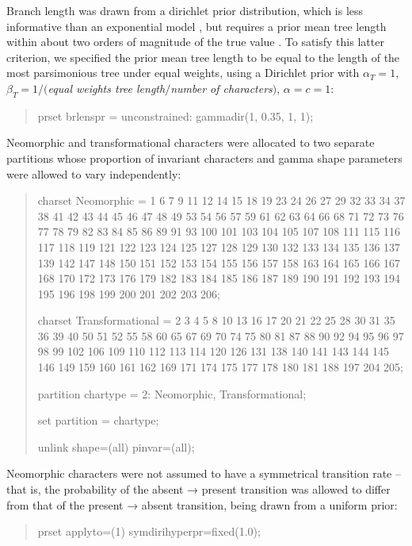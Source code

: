 \documentclass[openany]{book}
\theoremstyle{definition}
\theoremstyle{definition}
\theoremstyle{definition}
\theoremstyle{remark}
\begin{document}
Branch length was drawn from a dirichlet prior distribution, which is
less informative than an exponential model \citep{Rannala2012}, but
requires a prior mean tree length within about two orders of magnitude
of the true value \citep{Zhang2012}. To satisfy this latter criterion,
we specified the prior mean tree length to be equal to the length of the
most parsimonious tree under equal weights, using a Dirichlet prior with
\(\alpha_T = 1\), \(\beta_T = 1/(\)\emph{equal weights tree
length}\(/\)\emph{number of characters}\()\), \(\alpha = c = 1\):

\begin{quote}
prset brlenspr = unconstrained: gammadir(1, 0.35, 1, 1);
\end{quote}

Neomorphic and transformational characters
\citep[\emph{sensu}][]{Sereno2007} were allocated to two separate
partitions whose proportion of invariant characters and gamma shape
parameters were allowed to vary independently:

\begin{quote}
charset Neomorphic = 1 6 7 9 11 12 14 15 18 19 23 24 26 27 29 32 33 34
37 38 41 42 43 44 45 46 47 48 49 53 54 56 57 59 61 62 63 64 66 68 71 72
73 76 77 78 79 82 83 84 85 86 89 91 93 100 101 103 104 105 107 108 111
115 116 117 118 119 121 122 123 124 125 127 128 129 130 132 133 134 135
136 137 139 142 147 148 150 151 152 153 154 155 156 157 158 163 164 165
166 167 168 170 172 173 176 179 182 183 184 185 186 187 189 190 191 192
193 194 195 196 198 199 200 201 202 203 206;

charset Transformational = 2 3 4 5 8 10 13 16 17 20 21 22 25 28 30 31 35
36 39 40 50 51 52 55 58 60 65 67 69 70 74 75 80 81 87 88 90 92 94 95 96
97 98 99 102 106 109 110 112 113 114 120 126 131 138 140 141 143 144 145
146 149 159 160 161 162 169 171 174 175 177 178 180 181 188 197 204 205;

partition chartype = 2: Neomorphic, Transformational;

set partition = chartype;

unlink shape=(all) pinvar=(all);
\end{quote}

Neomorphic characters were not assumed to have a symmetrical transition
rate -- that is, the probability of the absent → present transition was
allowed to differ from that of the present → absent transition, being
drawn from a uniform prior:

\begin{quote}
prset applyto=(1) symdirihyperpr=fixed(1.0);
\end{quote}
\end{document}
